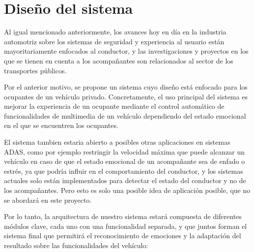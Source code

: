 \documentclass[12pt]{report} %
\begin{document}
\chapter{Diseño del sistema}

Al igual mencionado anteriormente, los avances hoy en día en la industria automotriz sobre los sistemas de seguridad y experiencia al usuario están mayoritariamente enfocados al conductor, y las investigaciones y proyectos en los que se tienen en cuenta a los acompañantes son relacionados al sector de los transportes públicos. 

Por el anterior motivo, se propone un sistema cuyo diseño está enfocado para los ocupantes de un vehículo privado. Concretamente, el uso principal del sistema es mejorar la experiencia de un ocupante mediante el control automático de funcionalidades de multimedia de un vehículo dependiendo del estado emocional en el que se encuentren los ocupantes.

El sistema tambien estaria abierto a posibles otras aplicaciones en sistemas ADAS, como por ejemplo restringir la velocidad máxima que puede alcanzar un vehículo en caso de que el estado emocional de un acompañante sea de enfado o estrés, ya que podría influir en el comportamiento del conductor, y los sistemas actuales solo están implementados para detectar el estado del conductor y no de los acompañantes. Pero esto es solo una posible idea de aplicación posible, que no se abordará en este proyecto. 

Por lo tanto, la arquitectura de nuestro sistema estará compuesta de diferentes módulos clave, cada uno con una funcionalidad separada, y que juntos forman el sistema final que permitirá el reconocimiento de emociones y la adaptación del resultado sobre las funcionalidades del vehículo:
\end{document}
